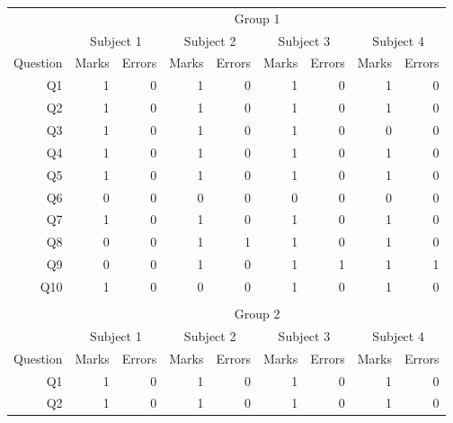 \documentclass[12pt,twoside,notitlepage,xetex]{report}
\begin{document}
\begin{center}
\begin{table}[H]
\begin{center}
\begin{tabular}{|r||r|r||r|r||r|r||r|r|}
\cline{2-9}
\multicolumn{1}{c|}{} & \multicolumn{8}{c|}{Group 1}\\ \cline{2-9}
\multicolumn{1}{c|}{} & \multicolumn{2}{c||}{Subject 1} & \multicolumn{2}{c||}{Subject 2} & \multicolumn{2}{c||}{Subject 3} & \multicolumn{2}{c|}{Subject 4}\\ \hline
\multicolumn{1}{|c||}{Question} & \multicolumn{1}{c|}{Marks} & \multicolumn{1}{c||}{Errors} & \multicolumn{1}{c|}{Marks} & \multicolumn{1}{c||}{Errors} & \multicolumn{1}{c|}{Marks} & \multicolumn{1}{c||}{Errors} & \multicolumn{1}{c|}{Marks} & \multicolumn{1}{c|}{Errors}\\ \hline \hline
Q1 & 1 & 0 & 1 & 0 & 1 & 0 & 1 & 0\\ \hline
Q2 & 1 & 0 & 1 & 0 & 1 & 0 & 1 & 0\\ \hline
Q3 & 1 & 0 & 1 & 0 & 1 & 0 & 0 & 0\\ \hline
Q4 & 1 & 0 & 1 & 0 & 1 & 0 & 1 & 0\\ \hline
Q5 & 1 & 0 & 1 & 0 & 1 & 0 & 1 & 0\\ \hline
Q6 & 0 & 0 & 0 & 0 & 0 & 0 & 0 & 0\\ \hline
Q7 & 1 & 0 & 1 & 0 & 1 & 0 & 1 & 0\\ \hline
Q8 & 0 & 0 & 1 & 1 & 1 & 0 & 1 & 0\\ \hline
Q9 & 0 & 0 & 1 & 0 & 1 & 1 & 1 & 1\\ \hline
Q10 & 1 & 0 & 0 & 0 & 1 & 0 & 1 & 0\\ \hline
\multicolumn{9}{c}{}\\ \cline{2-9}
\multicolumn{1}{c|}{} & \multicolumn{8}{c|}{Group 2}\\ \cline{2-9}
\multicolumn{1}{c|}{} & \multicolumn{2}{c||}{Subject 1} & \multicolumn{2}{c||}{Subject 2} & \multicolumn{2}{c||}{Subject 3} & \multicolumn{2}{c|}{Subject 4}\\ \hline
\multicolumn{1}{|c||}{Question} & \multicolumn{1}{c|}{Marks} & \multicolumn{1}{c||}{Errors} & \multicolumn{1}{c|}{Marks} & \multicolumn{1}{c||}{Errors} & \multicolumn{1}{c|}{Marks} & \multicolumn{1}{c||}{Errors} & \multicolumn{1}{c|}{Marks} & \multicolumn{1}{c|}{Errors}\\ \hline \hline
Q1 & 1 & 0 & 1 & 0 & 1 & 0 & 1 & 0\\ \hline
Q2 & 1 & 0 & 1 & 0 & 1 & 0 & 1 & 0\\ \hline

\end{tabular}
\end{center}
\end{table}
\end{center}
\end{document}
